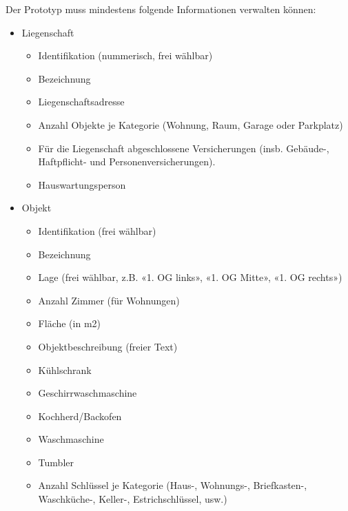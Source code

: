\vspace{3mm}
Der Prototyp muss mindestens folgende Informationen verwalten können:
\begin{itemize}
    \item Liegenschaft
    \begin{itemize}
        \item Identifikation (nummerisch, frei wählbar)
        \item Bezeichnung
        \item Liegenschaftsadresse
        \item Anzahl Objekte je Kategorie (Wohnung, Raum, Garage oder Parkplatz)
        \item Für die Liegenschaft abgeschlossene Versicherungen (insb. Gebäude-, Haftpflicht- und Personenversicherungen).
        \item Hauswartungsperson
    \end{itemize}
    \newpage
    \item Objekt
    \begin{itemize}
        \item Identifikation (frei wählbar)
        \item Bezeichnung
        \item Lage (frei wählbar, z.B. «1. OG links», «1. OG Mitte», «1. OG rechts»)
        \item Anzahl Zimmer (für Wohnungen)
        \item Fläche (in m2)
        \item Objektbeschreibung (freier Text)
        \item Kühlschrank \footnotemark{}
        \item Geschirrwaschmaschine\footnotemark[\value{footnote}]
        \item Kochherd/Backofen \footnotemark[\value{footnote}]
        \item Waschmaschine\footnotemark[\value{footnote}]
        \item Tumbler\footnotemark[\value{footnote}]
        \item Anzahl Schlüssel je Kategorie (Haus-, Wohnungs-, Briefkasten-, Waschküche-, Keller-, Estrichschlüssel, usw.)
    \end{itemize}


\end{itemize}

